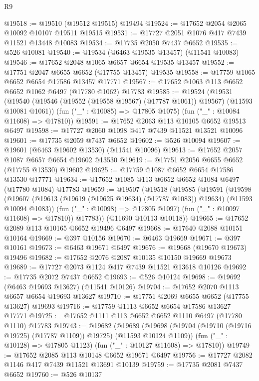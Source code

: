\begin{lexlean}{R9}
\begin{coremodule}
{{{{{{{{{{{{{{{{{{{{{{{{{{{{{{{{{{{{{{{{{{{{{{{{{{{{{{{{{{{{{{{{{{{{{{{{{{{{{{{{{{{{@19518 := @19510 (@19512 @19515) @19494
@19524 := @17652 @2054 @2065 @10092 @10107 @19511 @19515
@19531 := @17727 @2051 @1076 @417 @7439 @11521 @13448 @10083
@19534 := @17735 @2050 @7437 @6652
@19535 := @526 @10081
@19540 := @19534 (@6463 @19535 @13457) (@11541 @10083)
@19546 := @17652 @2048 @1065 @6657 @6654 @19535 @13457
@19552 := @17751 @2047 @6655 @6652 (@17755 @13457) @19535
@19558 := @17759 @1065 @6652 @6654 @17586 @13457 @17771
@19567 := @17652 @1063 @113 @6652 @6652 @1062 @6497 (@17780 @1062) @17783
@19585 := @19524
    (@19531
      (@19540 (@19546 (@19552 (@19558 @19567) (@17787 @1061)) @19567) (@11593 @10081 @1061))
      (fun ("_" : @10085) => @17805 @1075)
      (fun ("_" : @10084 @11608) => @17810))
@19591 := @17652 @2063 @113 @10105 @6652 @19513 @6497
@19598 := @17727 @2060 @1098 @417 @7439 @11521 @13521 @10096
@19601 := @17735 @2059 @7437 @6652
@19602 := @526 @10094
@19607 := @19601 (@6463 @19602 @13530) (@11541 @10096)
@19613 := @17652 @2057 @1087 @6657 @6654 @19602 @13530
@19619 := @17751 @2056 @6655 @6652 (@17755 @13530) @19602
@19625 := @17759 @1087 @6652 @6654 @17586 @13530 @17771
@19634 := @17652 @1085 @113 @6652 @6652 @1084 @6497 (@17780 @1084) @17783
@19659 := @19507
    (@19518
      (@19585
        (@19591
          (@19598
            (@19607 (@19613 (@19619 (@19625 @19634) (@17787 @1083)) @19634) (@11593 @10094 @1083))
            (fun ("_" : @10098) => @17805 @1097)
            (fun ("_" : @10097 @11608) => @17810))
          @17783))
      (@11690 @10113 @10118))
@19665 := @17652 @2089 @113 @10165 @6652 @19496 @6497
@19668 := @17640 @2088 @10151 @10164
@19669 := @397 @10156
@19670 := @6463 @19669
@19671 := @397 @10161
@19673 := @6463 @19671 @6497
@19676 := @19668 (@19670 @19673) @19496
@19682 := @17652 @2076 @2087 @10135 @10150 @19669 @19673
@19689 := @17727 @2073 @1124 @417 @7439 @11521 @13618 @10126
@19692 := @17735 @2072 @7437 @6652
@19693 := @526 @10124
@19698 := @19692 (@6463 @19693 @13627) (@11541 @10126)
@19704 := @17652 @2070 @1113 @6657 @6654 @19693 @13627
@19710 := @17751 @2069 @6655 @6652 (@17755 @13627) @19693
@19716 := @17759 @1113 @6652 @6654 @17586 @13627 @17771
@19725 := @17652 @1111 @113 @6652 @6652 @1110 @6497 (@17780 @1110) @17783
@19743 := @19682
    (@19689
      (@19698 (@19704 (@19710 (@19716 @19725) (@17787 @1109)) @19725) (@11593 @10124 @1109))
      (fun ("_" : @10128) => @17805 @1123)
      (fun ("_" : @10127 @11608) => @17810))
@19749 := @17652 @2085 @113 @10148 @6652 @19671 @6497
@19756 := @17727 @2082 @1146 @417 @7439 @11521 @13691 @10139
@19759 := @17735 @2081 @7437 @6652
@19760 := @526 @10137
}}}}}}}}}}}}}}}}}}}}}}}}}}}}}}}}}}}}}}}}}}}}}}}}}}}}}}}}}}}}}}}}}}}}}}}}}}}}}}}}}}}}
\end{coremodule}
\end{lexlean}
